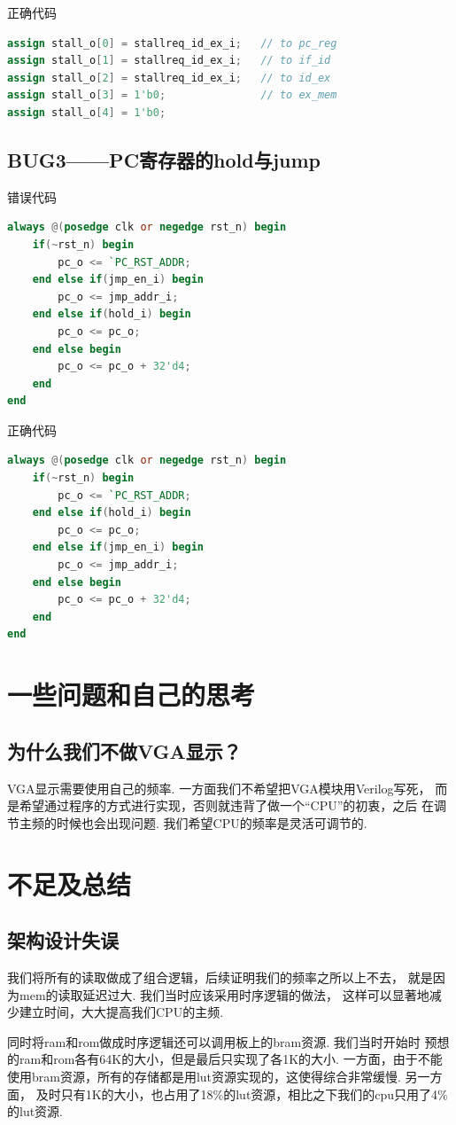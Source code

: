 \documentclass[lang=cn,11pt,a4paper,chinesefont=founder]{elegantpaper}
\begin{document}
正确代码
\begin{lstlisting}[language=verilog]
assign stall_o[0] = stallreq_id_ex_i;   // to pc_reg
assign stall_o[1] = stallreq_id_ex_i;   // to if_id
assign stall_o[2] = stallreq_id_ex_i;   // to id_ex
assign stall_o[3] = 1'b0;               // to ex_mem
assign stall_o[4] = 1'b0;
\end{lstlisting}

\subsection{BUG3——PC寄存器的hold与jump}

错误代码
\begin{lstlisting}[language=verilog]
always @(posedge clk or negedge rst_n) begin
    if(~rst_n) begin
        pc_o <= `PC_RST_ADDR;
    end else if(jmp_en_i) begin
        pc_o <= jmp_addr_i;
    end else if(hold_i) begin
        pc_o <= pc_o;
    end else begin
        pc_o <= pc_o + 32'd4;
    end
end
\end{lstlisting}

正确代码
\begin{lstlisting}[language=verilog]
always @(posedge clk or negedge rst_n) begin
    if(~rst_n) begin
        pc_o <= `PC_RST_ADDR;
    end else if(hold_i) begin
        pc_o <= pc_o;
    end else if(jmp_en_i) begin
        pc_o <= jmp_addr_i;
    end else begin
        pc_o <= pc_o + 32'd4;
    end
end
\end{lstlisting}

\section{一些问题和自己的思考}

\subsection{为什么我们不做VGA显示？}

VGA显示需要使用自己的频率. 一方面我们不希望把VGA模块用Verilog写死，
而是希望通过程序的方式进行实现，否则就违背了做一个“CPU”的初衷，之后
在调节主频的时候也会出现问题. 我们希望CPU的频率是灵活可调节的.

\section{不足及总结}

\subsection{架构设计失误}

我们将所有的读取做成了组合逻辑，后续证明我们的频率之所以上不去，
就是因为mem的读取延迟过大. 我们当时应该采用时序逻辑的做法，
这样可以显著地减少建立时间，大大提高我们CPU的主频.

同时将ram和rom做成时序逻辑还可以调用板上的bram资源. 我们当时开始时
预想的ram和rom各有64K的大小，但是最后只实现了各1K的大小. 一方面，由于不能
使用bram资源，所有的存储都是用lut资源实现的，这使得综合非常缓慢. 另一方面，
及时只有1K的大小，也占用了18\%的lut资源，相比之下我们的cpu只用了4\%的lut资源.
\end{document}
